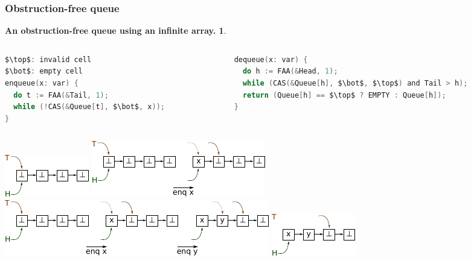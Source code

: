\documentclass[10pt,a4paper]{beamer}
\begin{document}
\theoremstyle{example}
\newtheorem{algo}[theorem]{An obstruction-free queue using an infinite array.}
\begin{frame}[fragile]
  \frametitle{Obstruction-free queue}
  \begin{overprint}
  \begin{algo}
    \begin{columns}
      \begin{column}{0.43\textwidth}
\begin{lstlisting}[mathescape, frame=single, label={lst:queue}, language=C, breaklines=true]
$\top$: invalid cell
$\bot$: empty cell
enqueue(x: var) {
  do t := FAA(&Tail, 1);
  while (!CAS(&Queue[t], $\bot$, x));
}
\end{lstlisting}
      \end{column}
      \begin{column}{0.55\textwidth}
\begin{lstlisting}[mathescape, frame=single, label={lst:queue}, language=C, breaklines=true]
dequeue(x: var) {
  do h := FAA(&Head, 1);
  while (CAS(&Queue[h], $\bot$, $\top$) and Tail > h);
  return (Queue[h] == $\top$ ? EMPTY : Queue[h]);
}
\end{lstlisting}
      \end{column}
    \end{columns}
  \end{algo}
\end{overprint}
\begin{overprint}
  \medskip
  \center
   \includegraphics[scale=1.6]{img/q1.pdf}
   \includegraphics[scale=1.6]{img/q2.pdf}
   \includegraphics[scale=1.6]{img/q3.pdf}
   \includegraphics[scale=1.6]{img/q4.pdf}

\end{overprint}
\end{frame}
\end{document}
